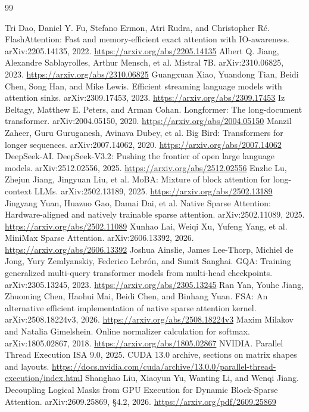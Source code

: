 \begin{thebibliography}{99}
\small\raggedright
{}\hypertarget{ref-1}{} Tri Dao, Daniel Y. Fu, Stefano Ermon, Atri Rudra, and Christopher Ré. FlashAttention: Fast and memory-efficient exact attention with IO-awareness. arXiv:2205.14135, 2022. \url{https://arxiv.org/abs/2205.14135}
\hypertarget{ref-2}{} Albert Q. Jiang, Alexandre Sablayrolles, Arthur Mensch, et al. Mistral 7B. arXiv:2310.06825, 2023. \url{https://arxiv.org/abs/2310.06825}
\hypertarget{ref-3}{} Guangxuan Xiao, Yuandong Tian, Beidi Chen, Song Han, and Mike Lewis. Efficient streaming language models with attention sinks. arXiv:2309.17453, 2023. \url{https://arxiv.org/abs/2309.17453}
\hypertarget{ref-4}{} Iz Beltagy, Matthew E. Peters, and Arman Cohan. Longformer: The long-document transformer. arXiv:2004.05150, 2020. \url{https://arxiv.org/abs/2004.05150}
\hypertarget{ref-5}{} Manzil Zaheer, Guru Guruganesh, Avinava Dubey, et al. Big Bird: Transformers for longer sequences. arXiv:2007.14062, 2020. \url{https://arxiv.org/abs/2007.14062}
\hypertarget{ref-6}{} DeepSeek-AI. DeepSeek-V3.2: Pushing the frontier of open large language models. arXiv:2512.02556, 2025. \url{https://arxiv.org/abs/2512.02556}
\hypertarget{ref-7}{} Enzhe Lu, Zhejun Jiang, Jingyuan Liu, et al. MoBA: Mixture of block attention for long-context LLMs. arXiv:2502.13189, 2025. \url{https://arxiv.org/abs/2502.13189}
\hypertarget{ref-8}{} Jingyang Yuan, Huazuo Gao, Damai Dai, et al. Native Sparse Attention: Hardware-aligned and natively trainable sparse attention. arXiv:2502.11089, 2025. \url{https://arxiv.org/abs/2502.11089}
\hypertarget{ref-9}{} Xunhao Lai, Weiqi Xu, Yufeng Yang, et al. MiniMax Sparse Attention. arXiv:2606.13392, 2026. \url{https://arxiv.org/abs/2606.13392}
\hypertarget{ref-10}{} Joshua Ainslie, James Lee-Thorp, Michiel de Jong, Yury Zemlyanskiy, Federico Lebrón, and Sumit Sanghai. GQA: Training generalized multi-query transformer models from multi-head checkpoints. arXiv:2305.13245, 2023. \url{https://arxiv.org/abs/2305.13245}
\hypertarget{ref-11}{} Ran Yan, Youhe Jiang, Zhuoming Chen, Haohui Mai, Beidi Chen, and Binhang Yuan. FSA: An alternative efficient implementation of native sparse attention kernel. arXiv:2508.18224v3, 2026. \url{https://arxiv.org/abs/2508.18224v3}
\hypertarget{ref-12}{} Maxim Milakov and Natalia Gimelshein. Online normalizer calculation for softmax. arXiv:1805.02867, 2018. \url{https://arxiv.org/abs/1805.02867}
\hypertarget{ref-13}{} NVIDIA. Parallel Thread Execution ISA 9.0, 2025. CUDA 13.0 archive, sections on matrix shapes and layouts. \url{https://docs.nvidia.com/cuda/archive/13.0.0/parallel-thread-execution/index.html}
\hypertarget{ref-14}{} Shanghao Liu, Xiaoyun Yu, Wanting Li, and Wenqi Jiang. Decoupling Logical Masks from GPU Execution for Dynamic Block-Sparse Attention. arXiv:2609.25869, §4.2, 2026. \url{https://arxiv.org/pdf/2609.25869}
\end{thebibliography}

